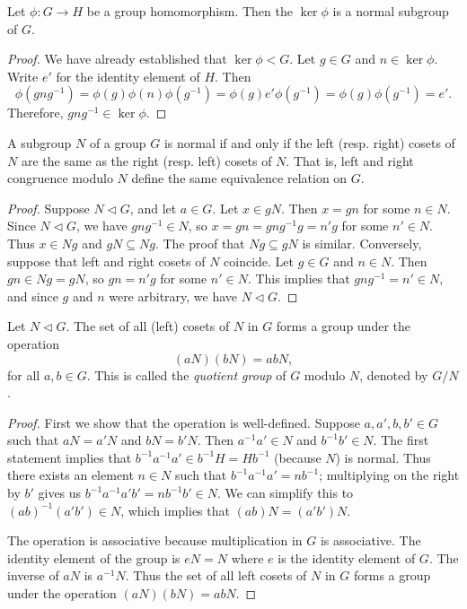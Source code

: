 \begin{theorem}
    Let \(\phi : G \to H\) be a group homomorphism. Then the \(\ker \phi\) is a normal subgroup of \(G\).
\end{theorem}

\begin{proof}
    We have already established that \(\ker \phi < G\). Let \(g \in G\) and \(n \in \ker \phi\). Write \(e'\) for the identity element of \(H\). Then
    \[
        \phi(gng^{-1}) = \phi(g)\phi(n)\phi(g^{-1}) = \phi(g)e'\phi(g^{-1}) = \phi(g)\phi(g^{-1}) = e'.
    \]
    Therefore, \(gng^{-1} \in \ker \phi\).
\end{proof}

\begin{theorem}
    A subgroup \(N\) of a group \(G\) is normal if and only if the left (resp. right) cosets of \(N\) are the same as the right (resp. left) cosets of \(N\). That is, left and right congruence modulo \(N\) define the same equivalence relation on \(G\).
\end{theorem}

\begin{proof}
    Suppose \(N \triangleleft G\), and let \(a \in G\). Let \(x \in gN\). Then \(x = gn\) for some \(n \in N\). Since \(N \triangleleft G\), we have \(gng^{-1} \in N\), so \(x = gn = gng^{-1}g = n'g\) for some \(n' \in N\). Thus \(x \in Ng\) and \(gN \subseteq Ng\). The proof that \(Ng \subseteq gN\) is similar. Conversely, suppose that left and right cosets of \(N\) coincide. Let \(g \in G\) and \(n \in N\). Then \(gn \in Ng = gN\), so \(gn = n'g\) for some \(n' \in N\). This implies that \(gng^{-1} = n' \in N\), and since \(g\) and \(n\) were arbitrary, we have \(N \triangleleft G\).
\end{proof}

\begin{theorem}
    \label{thm:quotient-group}
    Let \(N \triangleleft G\). The set of all (left) cosets of \(N\) in \(G\) forms a group under the operation
    \[
        (aN)(bN) = abN,
    \]
    for all \(a, b \in G\). This is called the \emph{quotient group} of \(G\) modulo \(N\), denoted by \(G/N\).
\end{theorem}

\begin{proof}
    First we show that the operation is well-defined. Suppose \(a, a', b, b' \in G\) such that \(aN = a'N\) and \(bN = b'N\). Then \(a^{-1}a' \in N\) and \(b^{-1}b' \in N\). The first statement implies that \(b^{-1}a^{-1}a' \in b^{-1}H = Hb^{-1}\) (because \(N\)) is normal. Thus there exists an element \(n \in N\) such that \(b^{-1}a^{-1}a' = nb^{-1}\); multiplying on the right by \(b'\) gives us \(b^{-1}a^{-1}a'b' = nb^{-1}b' \in N\). We can simplify this to \((ab)^{-1}(a'b') \in N\), which implies that \((ab)N = (a'b')N\).

    The operation is associative because multiplication in \(G\) is associative. The identity element of the group is \(eN = N\) where \(e\) is the identity element of \(G\). The inverse of \(aN\) is \(a^{-1}N\). Thus the set of all left cosets of \(N\) in \(G\) forms a group under the operation \((aN)(bN) = abN\).
\end{proof}

